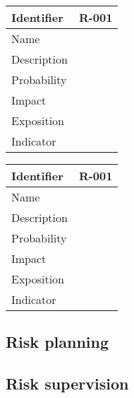 \begin{table}[H]
	\begin{tabularx}{\textwidth}{|l|X|}
		\hline
		\rowcolor{gray!30}
		Identifier & \textbf{R-001} \\ \hline
		Name & \\ \hline
		Description & \\ \hline
		Probability & \\ \hline
		Impact &  \\ \hline
		Exposition &  \\ \hline
		Indicator & \\ \hline
	\end{tabularx}
\end{table}



\begin{table}[H]
	\begin{tabularx}{\textwidth}{|l|X|}
		\hline
		\rowcolor{gray!30}
		Identifier & \textbf{R-001} \\ \hline
		Name & \\ \hline
		Description & \\ \hline
		Probability & \\ \hline
		Impact &  \\ \hline
		Exposition &  \\ \hline
		Indicator & \\ \hline
	\end{tabularx}
\end{table}



\subsection{Risk planning}


\subsection{Risk supervision}
